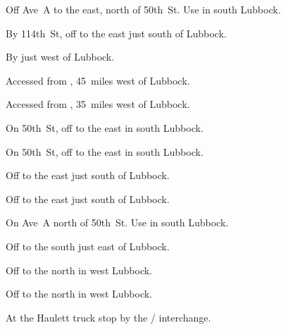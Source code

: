 
\begin{LocationList}

Off Ave~A to the east, north of 50th~St.
Use    in south Lubbock.

By 114th~St, off  to the east just south of Lubbock.

By  just west of Lubbock.

Accessed from , 45~miles west of Lubbock.

Accessed from , 35~miles west of Lubbock.

On 50th~St, off    to the east in south Lubbock.

On 50th~St, off    to the east in south Lubbock.

Off  to the east just south of Lubbock.

Off  to the east just south of Lubbock.

On Ave~A north of 50th~St.
Use    in south Lubbock.

Off  to the south just east of Lubbock.

Off  to the north in west Lubbock.

Off  to the north in west Lubbock.

At the Haulett truck stop by the   /   interchange.

\end{LocationList}
